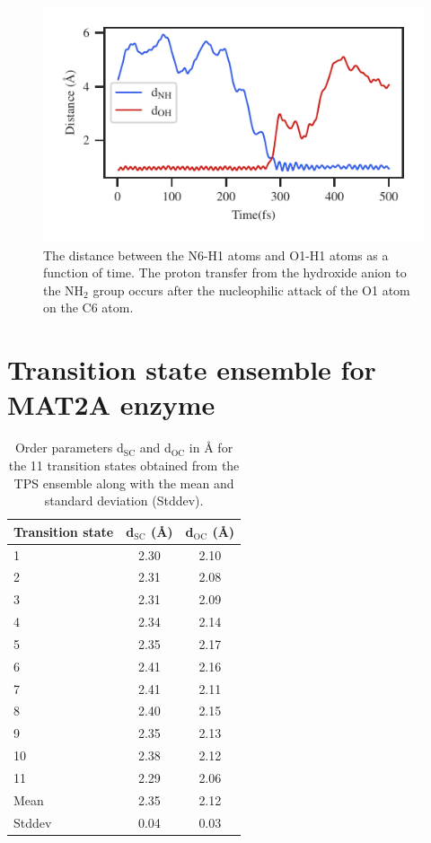 \documentclass[journal=jpcbfk,manuscript=suppinfo,layout=traditional]{achemso}
\begin{document}
\begin{figure}
\includegraphics[scale=1]{figures/ada-oh-nh60.pdf}
\caption{The distance between the N6-H1 atoms and O1-H1 atoms as a function of time. The proton transfer from the hydroxide
anion to the NH$_2$ group occurs after the nucleophilic attack of the O1 atom on the C6 atom.}
\label{sfig:n6proton}
\end{figure}

\section{Transition state ensemble for MAT2A enzyme}
\begin{table}[ht!]
\caption{Order parameters d$_{\text{SC}}$ and d$_{\text{OC}}$ in {\AA} for the 11 transition states obtained from 
the TPS ensemble along with the mean and standard deviation (Stddev).}
\centering
\begin{tabular}{l c c}
\hline\hline
Transition state & d$_{\text{SC}}$ ({\AA}) & d$_{\text{OC}}$ ({\AA})\\
\hline
1 & 2.30 & 2.10 \\
2 & 2.31 & 2.08 \\
3 & 2.31 & 2.09 \\
4 & 2.34 & 2.14 \\
5 & 2.35 & 2.17 \\
6 & 2.41 & 2.16 \\
7 & 2.41 & 2.11 \\
8 & 2.40 & 2.15 \\
9 & 2.35 & 2.13 \\
10& 2.38 & 2.12 \\
11& 2.29 & 2.06 \\
\hline
Mean & 2.35 & 2.12 \\
Stddev & 0.04 & 0.03 \\
\hline\hline
\end{tabular}
%
\end{table}
\end{document}
